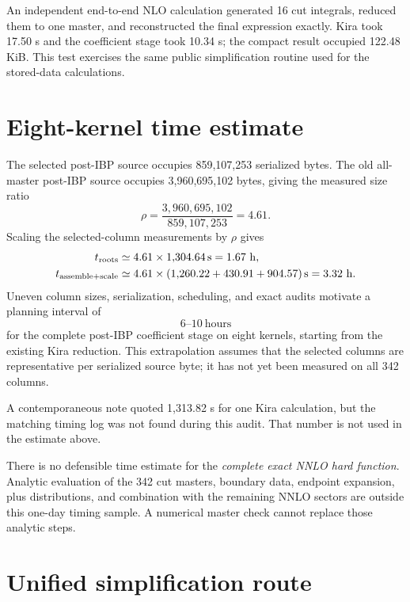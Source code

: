 \documentclass[11pt]{article}
\newcommand{\Sec}{\,\mathrm{s}}
\begin{document}
An independent end-to-end NLO calculation generated 16 cut integrals, reduced
them to one master, and reconstructed the final expression exactly.  Kira took
17.50 s and the coefficient stage took 10.34 s; the compact result occupied
122.48 KiB.  This test exercises the same public simplification routine used
for the stored-data calculations.

\section{Eight-kernel time estimate}

The selected post-IBP source occupies 859,107,253 serialized bytes.  The old
all-master post-IBP source occupies 3,960,695,102 bytes, giving the measured
size ratio
\begin{equation}
  \rho=\frac{3{,}960{,}695{,}102}{859{,}107{,}253}=4.61.
\end{equation}
Scaling the selected-column measurements by $\rho$ gives
\begin{align}
  t_{\rm roots}&\simeq 4.61\times1{,}304.64\Sec=1.67\ \mathrm{h},\\
  t_{\rm assemble+scale}&\simeq
  4.61\times(1{,}260.22+430.91+904.57)\Sec=3.32\ \mathrm{h}.
\end{align}
Uneven column sizes, serialization, scheduling, and exact audits motivate a
planning interval of
\begin{equation}
  \boxed{6\text{--}10\ \mathrm{hours}}
\end{equation}
for the complete post-IBP coefficient stage on eight kernels, starting from
the existing Kira reduction.  This extrapolation assumes that the selected
columns are representative per serialized source byte; it has not yet been
measured on all 342 columns.

A contemporaneous note quoted 1,313.82 s for one Kira calculation, but the
matching timing log was not found during this audit.  That number is not used
in the estimate above.

There is no defensible time estimate for the \emph{complete exact NNLO hard
function}.  Analytic evaluation of the 342 cut masters, boundary data,
endpoint expansion, plus distributions, and combination with the remaining
NNLO sectors are outside this one-day timing sample.  A numerical master check
cannot replace those analytic steps.

\section{Unified simplification route}
\end{document}
